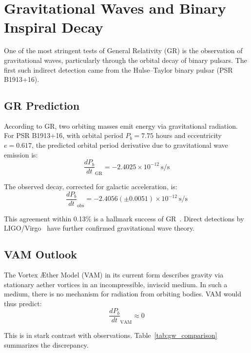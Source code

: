 \section{Gravitational Waves and Binary Inspiral Decay}

One of the most stringent tests of General Relativity (GR) is the observation of gravitational waves, particularly through the orbital decay of binary pulsars. The first such indirect detection came from the Hulse--Taylor binary pulsar (PSR B1913+16).

\subsection*{GR Prediction}

According to GR, two orbiting masses emit energy via gravitational radiation. For PSR B1913+16, with orbital period $P_b = 7.75$ hours and eccentricity $e = 0.617$, the predicted orbital period derivative due to gravitational wave emission is:
\begin{equation}
    \frac{dP_b}{dt}_{\text{GR}} = -2.4025\times10^{-12} \ \text{s/s}
\end{equation}

The observed decay, corrected for galactic acceleration, is:
\begin{equation}
    \frac{dP_b}{dt}_{\text{obs}} = -2.4056(\pm 0.0051)\times10^{-12} \ \text{s/s}
\end{equation}

This agreement within 0.13\% is a hallmark success of GR~\cite{weisberg2016}. Direct detections by LIGO/Virgo~\cite{abbott2016} have further confirmed gravitational wave theory.

\subsection*{VAM Outlook}

The Vortex \AE ther Model (VAM) in its current form describes gravity via stationary aether vortices in an incompressible, inviscid medium. In such a medium, there is no mechanism for radiation from orbiting bodies. VAM would thus predict:
\begin{equation}
    \frac{dP_b}{dt}_{\text{VAM}} \approx 0
\end{equation}

This is in stark contrast with observations. Table~\ref{tab:gw_comparison} summarizes the discrepancy.

